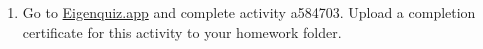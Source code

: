 \documentclass[12pt]{amsart}
\newcommand{\1}{\mathbbm{1}}
\numberwithin{equation}{section}
\numberwithin{Theorem}{section}
\theoremstyle{plain} %
\theoremstyle{definition}
\theoremstyle{remark}
\begin{document}
\begin{enumerate}[1.]
\bigskip

	
	
	

\vspace*{\fill}

\item Go to \href{https://eigenquiz.app/}{Eigenquiz.app} and complete activity a584703. Upload a completion certificate for this activity to your homework folder.

\end{enumerate}
\end{document}
